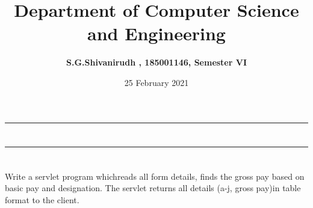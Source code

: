 \documentclass[12pt,letterpaper]{article}
\title{\textbf{Department of Computer Science and Engineering}}
\author{\textbf{S.G.Shivanirudh , 185001146, Semester VI }}
\date{25 February 2021}
\begin{document}
\maketitle
\hrule
\section*{}
\hrule 
\bigskip\bigskip

\section*{}

\subsection*{}
\begin{flushleft}
    Write a servlet program whichreads all form details, finds the gross pay based on basic pay and designation. 
    The servlet returns all details (a-j, gross pay)in table format to the client.
\end{flushleft}

\subsection*{}
\subsubsection*{}
\begin{flushleft}

\end{flushleft}

\subsubsection*{{}}
\begin{flushleft}
    
\end{flushleft}

\subsubsection*{{}}
\begin{flushleft}
    
\end{flushleft}
\end{document}
